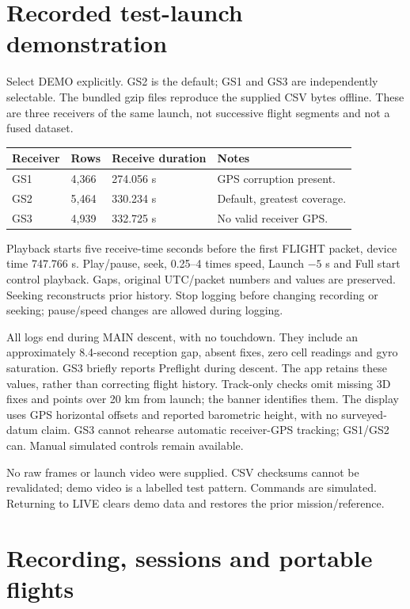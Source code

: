 \section{Recorded test-launch demonstration}\label{sec:demo}
Select DEMO explicitly. GS2 is the default; GS1 and GS3 are independently
selectable. The bundled gzip files reproduce the supplied CSV bytes offline.
These are three receivers of the same launch, not successive flight segments
and not a fused dataset.
\begin{longtable}{@{}L{.23\linewidth}L{.22\linewidth}L{.25\linewidth}L{.23\linewidth}@{}}
\toprule Receiver & Rows & Receive duration & Notes \\\midrule\endhead
GS1 & 4,366 & 274.056 s & GPS corruption present. \\
GS2 & 5,464 & 330.234 s & Default, greatest coverage. \\
GS3 & 4,939 & 332.725 s & No valid receiver GPS. \\
\bottomrule
\end{longtable}
Playback starts five receive-time seconds before the first FLIGHT packet,
device time 747.766 s. Play/pause, seek, 0.25--4 times speed, Launch $-5$ s and
Full start control playback. Gaps, original UTC/packet numbers and values are
preserved. Seeking reconstructs prior history. Stop logging before changing
recording or seeking; pause/speed changes are allowed during logging.

All logs end during MAIN descent, with no touchdown. They include an
approximately 8.4-second reception gap, absent fixes, zero cell readings and
gyro saturation. GS3 briefly reports Preflight during descent. The app retains
these values, rather than correcting flight history. Track-only checks omit
missing 3D fixes and points over 20 km from launch; the banner identifies them.
The display uses GPS horizontal offsets and reported barometric height, with
no surveyed-datum claim. GS3 cannot rehearse automatic receiver-GPS tracking;
GS1/GS2 can. Manual simulated controls remain available.

No raw frames or launch video were supplied. CSV checksums cannot be
revalidated; demo video is a labelled test pattern. Commands are simulated.
Returning to LIVE clears demo data and restores the prior mission/reference.

\section{Recording, sessions and portable flights}\label{sec:persistence}
